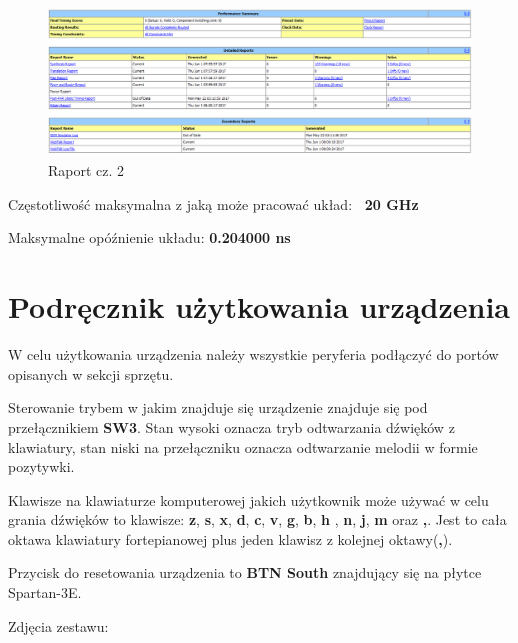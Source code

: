 \documentclass[a4paper]{report}
\begin{document}
	\newpage
	
	\begin{figure}[h!]
				\centering
				\includegraphics[width=1.0\textwidth]{report2.png}
				\caption{Raport cz. 2}
	\end{figure}	
	
	Częstotliwość maksymalna z jaką może pracować układ:
	\textbf{~20 GHz}
	 
	Maksymalne opóźnienie układu:
	\textbf{0.204000 ns}
	
	
		
	\section{Podręcznik użytkowania urządzenia}
	\par W celu użytkowania urządzenia należy wszystkie peryferia podłączyć do portów opisanych w sekcji sprzętu.
	
	\par Sterowanie trybem w jakim znajduje się urządzenie znajduje się pod przełącznikiem \textbf{SW3}. Stan wysoki
	oznacza tryb odtwarzania dźwięków z klawiatury, stan niski na przełączniku oznacza odtwarzanie melodii w formie
	pozytywki.
	\par Klawisze na klawiaturze komputerowej jakich użytkownik może używać w celu grania dźwięków to klawisze:
	\textbf{z}, \textbf{s}, \textbf{x}, \textbf{d}, \textbf{c}, \textbf{v}, \textbf{g}, \textbf{b}, \textbf{h}
	, \textbf{n}, \textbf{j}, \textbf{m} oraz \textbf{,}. Jest to cała oktawa klawiatury fortepianowej plus jeden
	klawisz z kolejnej oktawy(\textbf{,}).
	
	\par Przycisk do resetowania urządzenia to \textbf{BTN South} znajdujący się na płytce Spartan-3E.
	
	Zdjęcia zestawu:\\
	
\end{document}
